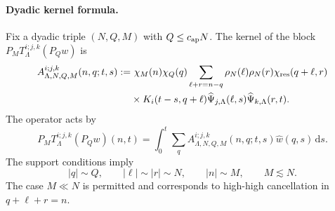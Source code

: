 \documentclass[11pt,reqno]{amsart}
\numberwithin{equation}{section}
\theoremstyle{plain}
\theoremstyle{definition}
\newcommand{\dd}{\,\mathrm d}
\newcommand{\wh}{\widehat}
\begin{document}
\paragraph{Dyadic kernel formula.}
Fix a dyadic triple \((N,Q,M)\) with \(Q\le c_{\rm ap}N\).  The kernel of the block \(P_MT_{\Lambda}^{i;j,k}(P_Qw)\) is
\begin{equation}\label{eq:dyadic-kernel}
\begin{aligned}
        A_{\Lambda,N,Q,M}^{i;j,k}(n,q;t,s)
        :=&\ \chi_M(n)\chi_Q(q)
        \sum_{\ell+r=n-q}\rho_N(\ell)\rho_N(r)\chi_{\rm res}(q+\ell,r)\\
        &\times K_i(t-s,q+\ell)
        \wh\Psi_{j,\Lambda}(\ell,s)\wh\Psi_{k,\Lambda}(r,t).
\end{aligned}
\end{equation}
The operator acts by
\begin{equation}\label{eq:kernel-action}
        P_MT_{\Lambda}^{i;j,k}(P_Qw)(n,t)
        =\int_0^t\sum_q A_{\Lambda,N,Q,M}^{i;j,k}(n,q;t,s)\wh w(q,s)\dd s.
\end{equation}
The support conditions imply
\begin{equation}\label{eq:support-geometry}
        |q|\sim Q,
        \qquad
        |\ell|\sim |r|\sim N,
        \qquad
        |n|\sim M,
        \qquad
        M\lesssim N.
\end{equation}
The case \(M\ll N\) is permitted and corresponds to high-high cancellation in \(q+\ell+r=n\).
\end{document}
